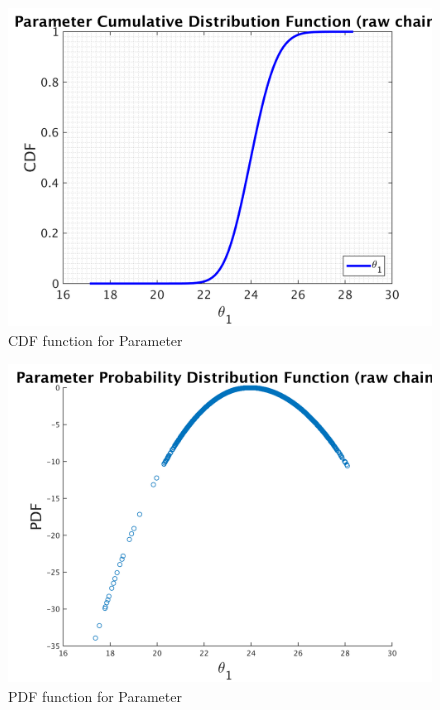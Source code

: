 \begin{figure}[H]
  
  \centering
   \includegraphics[scale=0.75]{100_results/outputData_10/simple_ip_cdf_raw}
   \caption{CDF function for Parameter }
\end{figure}



\begin{figure}[H]
  
  \centering
   \includegraphics[scale=0.75]{100_results/outputData_10/ip_logLike_unified}
   \caption{PDF function for Parameter }
\end{figure}



